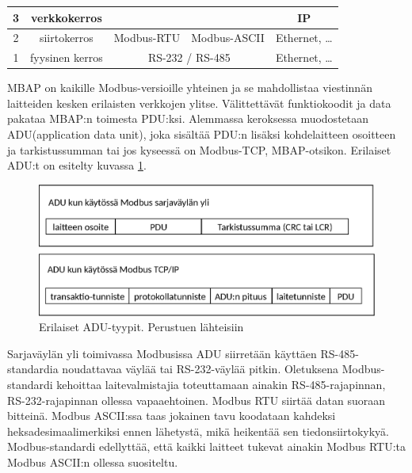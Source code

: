 \begin{table}
\begin{tabular}{|c|c|ccc}
        3                                         & verkkokerros                     &                                                         & \multicolumn{1}{c|}{}                                     & \multicolumn{1}{c|}{IP}                                                  \\ \hline
        2                                         & siirtokerros                     & \multicolumn{1}{c|}{\cellcolor{blue}Modbus-RTU}         & \multicolumn{1}{c|}{\cellcolor{blue}Modbus-ASCII}         & \multicolumn{1}{c|}{Ethernet, \dots}                                     \\ \hline
        1                                         & fyysinen kerros                  & \multicolumn{2}{c|}{RS-232 / RS-485}                                                                                & \multicolumn{1}{c|}{Ethernet, \dots}                                     \\ \hline
      \end{tabular}
      \label{rakenne}
    \end{table}

    \gls{MBAP} on kaikille Modbus-versioille yhteinen ja se mahdollistaa viestinnän laitteiden kesken erilaisten verkkojen ylitse. Välittettävät funktiokoodit ja data pakataa \gls{MBAP}:n toimesta PDU:ksi. Alemmassa keroksessa muodostetaan \gls{ADU}(application data unit), joka sisältää PDU:n lisäksi kohdelaitteen osoitteen ja tarkistussumman tai jos kyseessä on Modbus-TCP, \gls{MBAP}-otsikon. Erilaiset ADU:t on esitelty kuvassa \ref{fig:adu}.
    \begin{figure}[h]
      \centering
      \includegraphics[width=1\textwidth]{figures/adu}
      \caption[ADU-tyypit]{Erilaiset ADU-tyypit.  Perustuen lähteisiin \parencite{modbusTCPIPSpec, modbusSerialSpec}}
      \label{fig:adu}
    \end{figure}

    Sarjaväylän yli toimivassa Modbusissa ADU siirretään käyttäen RS-485-standardia noudattavaa väylää tai RS-232-väylää pitkin. Oletuksena Modbus-standardi kehoittaa laitevalmistajia toteuttamaan ainakin RS-485-rajapinnan, RS-232-rajapinnan ollessa vapaaehtoinen. Modbus \gls{RTU} siirtää datan suoraan bitteinä. Modbus \gls{ASCII}:ssa taas jokainen tavu koodataan kahdeksi heksadesimaalimerkiksi ennen lähetystä, mikä heikentää sen tiedonsiirtokykyä. Modbus-standardi edellyttää, että kaikki laitteet tukevat ainakin Modbus RTU:ta Modbus ASCII:n ollessa suositeltu.\parencite{modbusSerialSpec} 

